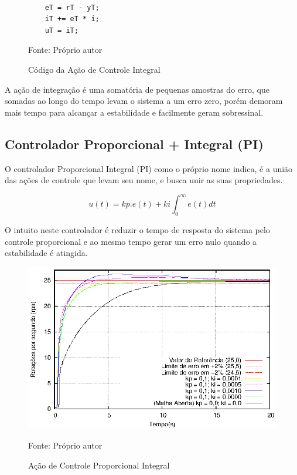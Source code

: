 \begin{figure}[!htb]
\centering
\caption{Código da Ação de Controle Integral}
\begin{minipage}{0.8\linewidth}
\lstset{firstnumber=13}
\begin{lstlisting}

    eT = rT - yT;
    iT += eT * i; 
    uT = iT;
\end{lstlisting}
\end{minipage}
\label{fig:codigoControladorI}

{\small Fonte: Próprio autor}
\end{figure}

A ação de integração é uma somatória de pequenas amostras do erro, que somadas ao longo do tempo levam o sistema a um erro zero, porém demoram mais tempo para alcançar a estabilidade e facilmente geram sobressinal.










\subsection{ Controlador Proporcional + Integral (PI) }

O controlador Proporcional Integral (PI) como o próprio nome indica, é a união das ações de controle que levam seu nome, e busca unir as suas propriedades.
 
\begin{equation}
u(t) = kp.e(t) + ki \int_{0}^{\infty} e(t) dt
\end{equation}

O intuito neste controlador é reduzir o tempo de resposta do sistema pelo controle proporcional e ao mesmo tempo gerar um erro nulo quando a estabilidade é atingida.

\begin{figure}[!htb]
\caption{Ação de Controle Proporcional Integral}
\center\includegraphics[scale=1.2]{./imagens/acaoPI.eps}
\label{fig:acaoPI}

{\small Fonte: Próprio autor}
\end{figure}

